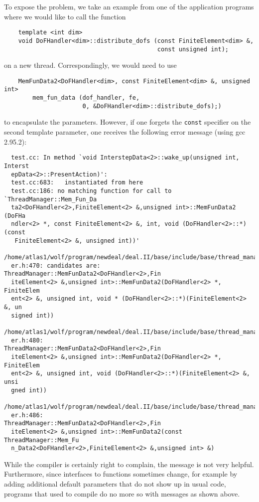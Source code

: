 \documentclass[11pt]{article}
\begin{document}
To expose the problem, we take an example from one of the application programs
where we would like to call the function
\begin{verbatim}
    template <int dim>
    void DoFHandler<dim>::distribute_dofs (const FiniteElement<dim> &,
                                           const unsigned int);
\end{verbatim}
on a new thread. Correspondingly, we would need to use
\begin{verbatim}
    MemFunData2<DoFHandler<dim>, const FiniteElement<dim> &, unsigned int>
        mem_fun_data (dof_handler, fe,
                      0, &DoFHandler<dim>::distribute_dofs);)
\end{verbatim}
to encapsulate the parameters. However, if one forgets the \texttt{const}
specifier on the second template parameter, one receives the following error
message (using gcc 2.95.2):
\begin{verbatim}
  test.cc: In method `void InterstepData<2>::wake_up(unsigned int, Interst
  epData<2>::PresentAction)':
  test.cc:683:   instantiated from here
  test.cc:186: no matching function for call to `ThreadManager::Mem_Fun_Da
  ta2<DoFHandler<2>,FiniteElement<2> &,unsigned int>::MemFunData2 (DoFHa
  ndler<2> *, const FiniteElement<2> &, int, void (DoFHandler<2>::*)(const
   FiniteElement<2> &, unsigned int))'
  /home/atlas1/wolf/program/newdeal/deal.II/base/include/base/thread_manag
  er.h:470: candidates are: ThreadManager::MemFunData2<DoFHandler<2>,Fin
  iteElement<2> &,unsigned int>::MemFunData2(DoFHandler<2> *, FiniteElem
  ent<2> &, unsigned int, void * (DoFHandler<2>::*)(FiniteElement<2> &, un
  signed int))
  /home/atlas1/wolf/program/newdeal/deal.II/base/include/base/thread_manag
  er.h:480:                 ThreadManager::MemFunData2<DoFHandler<2>,Fin
  iteElement<2> &,unsigned int>::MemFunData2(DoFHandler<2> *, FiniteElem
  ent<2> &, unsigned int, void (DoFHandler<2>::*)(FiniteElement<2> &, unsi
  gned int))
  /home/atlas1/wolf/program/newdeal/deal.II/base/include/base/thread_manag
  er.h:486:                 ThreadManager::MemFunData2<DoFHandler<2>,Fin
  iteElement<2> &,unsigned int>::MemFunData2(const ThreadManager::Mem_Fu
  n_Data2<DoFHandler<2>,FiniteElement<2> &,unsigned int> &)
\end{verbatim}

While the compiler is certainly right to complain, the message is not very
helpful. Furthermore, since interfaces to functions sometimes change, for
example by adding additional default parameters that do not show up in usual
code, programs that used to compile do no more so with messages as shown
above. 
\end{document}
